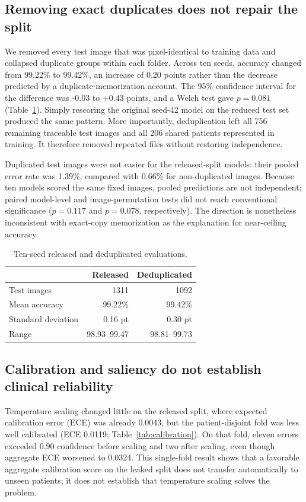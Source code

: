 ﻿\documentclass[twocolumn]{article}
\begin{document}
\subsection{Removing exact duplicates does not repair the split}
We removed every test image that was pixel-identical to training data and collapsed duplicate groups within each folder. Across ten seeds, accuracy changed from 99.22\% to 99.42\%, an increase of 0.20 points rather than the decrease predicted by a duplicate-memorization account. The 95\% confidence interval for the difference was -0.03 to +0.43 points, and a Welch test gave $p=0.081$ (Table~\ref{tab:dedup}). Simply rescoring the original seed-42 model on the reduced test set produced the same pattern. More importantly, deduplication left all 756 remaining traceable test images and all 206 shared patients represented in training. It therefore removed repeated files without restoring independence.

Duplicated test images were not easier for the released-split models: their pooled error rate was 1.39\%, compared with 0.66\% for non-duplicated images. Because ten models scored the same fixed images, pooled predictions are not independent; paired model-level and image-permutation tests did not reach conventional significance ($p=0.117$ and $p=0.078$, respectively). The direction is nonetheless inconsistent with exact-copy memorization as the explanation for near-ceiling accuracy.

\begin{table}[H]
\centering
\caption{Ten-seed released and deduplicated evaluations.}
\label{tab:dedup}
\small
\begin{tabular}{lrr}
\toprule
 & Released & Deduplicated \\
\midrule
Test images & 1311 & 1092 \\
Mean accuracy & 99.22\% & 99.42\% \\
Standard deviation & 0.16 pt & 0.30 pt \\
Range & 98.93--99.47 & 98.81--99.73 \\
\bottomrule
\end{tabular}
\end{table}

\subsection{Calibration and saliency do not establish clinical reliability}
Temperature scaling changed little on the released split, where expected calibration error (ECE) was already 0.0043, but the patient-disjoint fold was less well calibrated (ECE 0.0119; Table~\ref{tab:calibration}). On that fold, eleven errors exceeded 0.90 confidence before scaling and two after scaling, even though aggregate ECE worsened to 0.0324. This single-fold result shows that a favorable aggregate calibration score on the leaked split does not transfer automatically to unseen patients; it does not establish that temperature scaling solves the problem.
\end{document}
